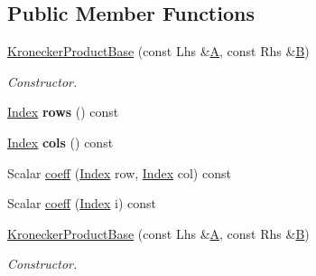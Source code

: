 \subsection*{Public Member Functions}
\begin{DoxyCompactItemize}
\item 
\mbox{\label{class_eigen_1_1_kronecker_product_base_a0cb05eaa978b9fdc0285b48a6e0ecfb1}} 
\hyperlink{class_eigen_1_1_kronecker_product_base_a0cb05eaa978b9fdc0285b48a6e0ecfb1}{Kronecker\+Product\+Base} (const Lhs \&\hyperlink{group___core___module_class_eigen_1_1_matrix}{A}, const Rhs \&\hyperlink{group___core___module_class_eigen_1_1_matrix}{B})
\begin{DoxyCompactList}\small\item\em Constructor. \end{DoxyCompactList}\item 
\mbox{\label{class_eigen_1_1_kronecker_product_base_af56e882e5fbf162bfa2fab85810dd26f}} 
\hyperlink{namespace_eigen_a62e77e0933482dafde8fe197d9a2cfde}{Index} {\bfseries rows} () const
\item 
\mbox{\label{class_eigen_1_1_kronecker_product_base_af3fa696ee7b8faaf7011b4a4e60828f3}} 
\hyperlink{namespace_eigen_a62e77e0933482dafde8fe197d9a2cfde}{Index} {\bfseries cols} () const
\item 
Scalar \hyperlink{class_eigen_1_1_kronecker_product_base_a0b302d4e55f5a58955e6c645d066928f}{coeff} (\hyperlink{namespace_eigen_a62e77e0933482dafde8fe197d9a2cfde}{Index} row, \hyperlink{namespace_eigen_a62e77e0933482dafde8fe197d9a2cfde}{Index} col) const
\item 
Scalar \hyperlink{class_eigen_1_1_kronecker_product_base_a673348e7d9d2a4570aa0bcac33507f7b}{coeff} (\hyperlink{namespace_eigen_a62e77e0933482dafde8fe197d9a2cfde}{Index} i) const
\item 
\mbox{\label{class_eigen_1_1_kronecker_product_base_a0cb05eaa978b9fdc0285b48a6e0ecfb1}} 
\hyperlink{class_eigen_1_1_kronecker_product_base_a0cb05eaa978b9fdc0285b48a6e0ecfb1}{Kronecker\+Product\+Base} (const Lhs \&\hyperlink{group___core___module_class_eigen_1_1_matrix}{A}, const Rhs \&\hyperlink{group___core___module_class_eigen_1_1_matrix}{B})
\begin{DoxyCompactList}\small\item\em Constructor. \end{DoxyCompactList}\item 

\end{DoxyCompactItemize}

